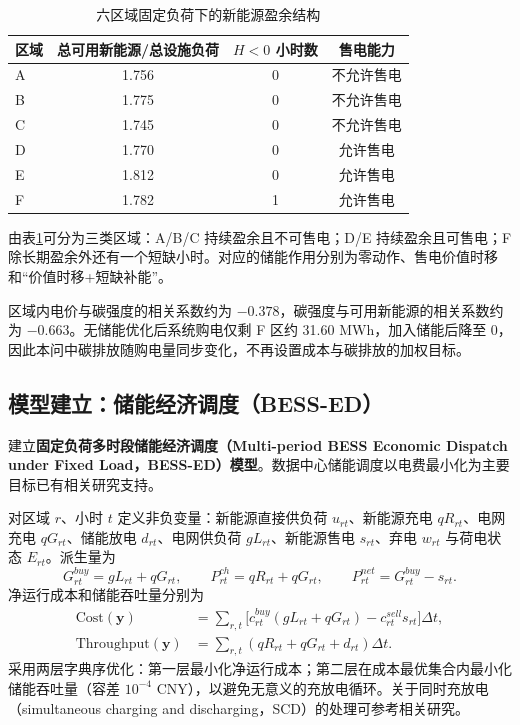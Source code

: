 \begingroup
{}
\begin{table}[!htbp]
\centering
\caption{六区域固定负荷下的新能源盈余结构}
\label{tab:q3-surplus-structure}
\begin{tabular}{lccc}
\toprule
\rowcolor{CumcmLightBlue}
区域 & 总可用新能源/总设施负荷 & $H<0$ 小时数 & 售电能力 \\
\midrule
A & 1.756 & 0 & 不允许售电 \\
B & 1.775 & 0 & 不允许售电 \\
C & 1.745 & 0 & 不允许售电 \\
D & 1.770 & 0 & 允许售电 \\
E & 1.812 & 0 & 允许售电 \\
F & 1.782 & 1 & 允许售电 \\
\bottomrule
\end{tabular}
\end{table}
\endgroup

由表\ref{tab:q3-surplus-structure}可分为三类区域：A/B/C 持续盈余且不可售电；D/E 持续盈余且可售电；F 除长期盈余外还有一个短缺小时。对应的储能作用分别为零动作、售电价值时移和“价值时移+短缺补能”。

区域内电价与碳强度的相关系数约为 $-0.378$，碳强度与可用新能源的相关系数约为 $-0.663$。无储能优化后系统购电仅剩 F 区约 31.60 MWh，加入储能后降至 0，因此本问中碳排放随购电量同步变化，不再设置成本与碳排放的加权目标。

\subsection{模型建立：储能经济调度（BESS-ED）}

建立\textbf{固定负荷多时段储能经济调度（Multi-period BESS Economic Dispatch under Fixed Load，BESS-ED）模型}。数据中心储能调度以电费最小化为主要目标已有相关研究支持\cite{zhang_dc_bess_2025}。

对区域 $r$、小时 $t$ 定义非负变量：新能源直接供负荷 $u_{rt}$、新能源充电 $qR_{rt}$、电网充电 $qG_{rt}$、储能放电 $d_{rt}$、电网供负荷 $gL_{rt}$、新能源售电 $s_{rt}$、弃电 $w_{rt}$ 与荷电状态 $E_{rt}$。派生量为
\begin{equation}
G^{buy}_{rt}=gL_{rt}+qG_{rt},\qquad
P^{ch}_{rt}=qR_{rt}+qG_{rt},\qquad
P^{net}_{rt}=G^{buy}_{rt}-s_{rt}.
\end{equation}
净运行成本和储能吞吐量分别为
\begin{align}
\mathrm{Cost}(\mathbf y)&=\sum_{r,t}\bigl[c^{buy}_{rt}(gL_{rt}+qG_{rt})-c^{sell}_{rt}s_{rt}\bigr]\Delta t,\label{eq:q3-cost}\\
\mathrm{Throughput}(\mathbf y)&=\sum_{r,t}(qR_{rt}+qG_{rt}+d_{rt})\Delta t.\label{eq:q3-throughput}
\end{align}
采用两层字典序优化：第一层最小化净运行成本；第二层在成本最优集合内最小化储能吞吐量（容差 $10^{-4}$ CNY），以避免无意义的充放电循环。关于同时充放电（simultaneous charging and discharging，SCD）的处理可参考相关研究\cite{wang_exact_relax_2024}。

